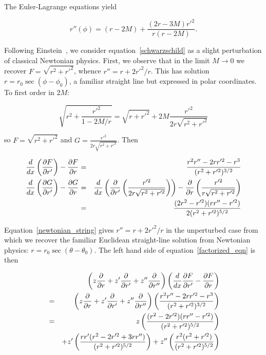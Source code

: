 \documentclass[pdflatex,sn-mathphys-num]{sn-jnl}%
\theoremstyle{thmstyleone}%
\theoremstyle{thmstyletwo}%
\theoremstyle{thmstylethree}%
\begin{document}
The Euler-Lagrange
equations yield

\begin{equation}\label{eulerstring}
  r''(\phi) = (r-2M) + \frac{(2r-3M)r'^2}{r(r-2M)}.
\end{equation}


Following Einstein~\cite{einstein1915}, we consider
equation~\ref{schwarzschild} as a slight perturbation of classical
Newtonian physics.  First, we observe that in the limit
$M\longrightarrow 0$ we recover $F=\sqrt{r^2+r'^2}$, whence $r'' = r +
2r'^2/r$.  This has solution $r=r_0\sec(\phi-\phi_0)$, a familiar
straight line but expressed in polar coordinates.  To first order in
$2M$:

\begin{equation}
\sqrt{r^2 + \frac{r'^2}{1-2M/r}}=\sqrt{r+r'^2} + 2M\frac{r'^2}{2r\sqrt{r^2 + r'^2}}
\end{equation}
  
so $F=\sqrt{r^2+r'^2}$ and $G=\frac{r'^2}{2r\sqrt{r^2+r'^2}}$.  Then

\begin{eqnarray}\label{newtonian_string}
\frac{d}{dx}\left(\frac{\partial{F}}{\partial{r'}}\right) -\frac{\partial{F}}{\partial{r}} &=& \frac{r^2r''- 2rr'^2 -r^3}{(r^2 +r'^2)^{3/2}}\nonumber\\
\frac{d}{dx}\left(\frac{\partial{G}}{\partial{r'}}\right) -\frac{\partial{G}}{\partial{r}} &=&
\frac{d}{dx}\left(\frac{\partial}{\partial r'}\left(\frac{r'^2}{2r\sqrt{r^2+r'^2}}\right)\right)
- \frac{\partial}{\partial
  r}\left(\frac{r'^2}{r\sqrt{r^2+r'^2}}\right)\nonumber\\
&=& \frac{(2r^2-r'^2)(rr''-r'^2)}{2(r^2+r'^2)^{5/2}}
\end{eqnarray}

Equation~\ref{newtonian_string} gives $r'' = r + 2r'^2/r$ in the
unperturbed case from which we recover the familiar Euclidean
straight-line solution from Newtonian physics:
$r=r_0\sec(\theta-\theta_0)$.  The left hand side of
equation~\ref{factorized_eqn} is then

\begin{eqnarray}
&{}& \left(z\frac{\partial{}}{\partial{r}} + z'\frac{\partial{}}{\partial{r'}} + z''\frac{\partial{}}{\partial{r''}}\right)
\left(\frac{d}{dx}\frac{\partial{F}}{\partial{r'}}
-\frac{\partial{F}}{\partial{r}}\right)\nonumber\\
&=&  \left(z\frac{\partial{}}{\partial{r}} + z'\frac{\partial{}}{\partial{r'}} + z''\frac{\partial{}}{\partial{r''}}\right)
\left(\frac{r^2r''- 2rr'^2 -r^3}{(r^2 +r'^2)^{3/2}}\right)\nonumber\\
&=& 
 z  \left(\frac{(r^2 - 2r'^2)(rr''-r'^2)}{(r^2 + r'^2)^{5/2}}\right)\nonumber\\
 &{}& + z' \left(\frac{rr'(r^2 - 2r'^2 + 3rr'')}{(r^2 + r'^2)^{5/2}}\right)
      + z''\left(\frac{r^2    (r^2+r'^2)       }{(r^2 + r'^2)^{5/2}}\right)
\end{eqnarray}
\end{document}
